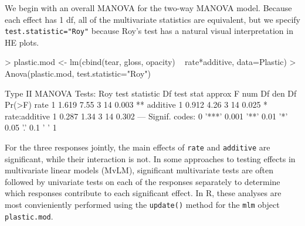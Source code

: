 \documentclass[11pt]{article}
\newcommand*{\MLM}{MvLM\xspace}
\newcommand{\R}{\textsf{R}\xspace}
\newcommand{\code}[1]{{\texttt{#1}}}
\newcommand{\func}[1]{{\texttt{#1()}}}
\begin{document}
We begin with an overall MANOVA for the two-way MANOVA model.
Because each effect has 1 df, all of the multivariate statistics are equivalent,
but we specify \code{test.statistic="Roy"} because Roy's test has
a natural visual interpretation in HE plots.
\begin{Schunk}
\begin{Sinput}
> plastic.mod <- lm(cbind(tear, gloss, opacity) ~ rate*additive, data=Plastic)
> Anova(plastic.mod, test.statistic="Roy")
\end{Sinput}
\begin{Soutput}
Type II MANOVA Tests: Roy test statistic
              Df test stat approx F num Df den Df Pr(>F)   
rate           1     1.619     7.55      3     14  0.003 **
additive       1     0.912     4.26      3     14  0.025 * 
rate:additive  1     0.287     1.34      3     14  0.302   
---
Signif. codes:  0 '***' 0.001 '**' 0.01 '*' 0.05 '.' 0.1 ' ' 1 
\end{Soutput}
\end{Schunk}
For the three responses jointly, the main effects of  \code{rate} and \code{additive}
are significant, while their interaction is not.
In some approaches to testing effects in multivariate linear models (\MLM),
significant multivariate tests are often followed by univariate tests on each
of the responses separately to determine which responses contribute to each
significant effect.  In \R, these analyses are most convieniently performed
using the \func{update} method for the \code{mlm} object \code{plastic.mod}.
\end{document}
